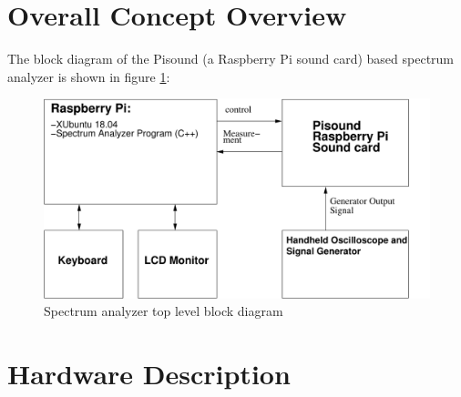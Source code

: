 \documentclass[11pt, oneside]{scrartcl}   	%
\begin{document}
\section{Overall Concept Overview}
The block diagram of the Pisound (a Raspberry Pi sound card) based spectrum analyzer is shown in figure \ref{fig:toplevelfunctionalblock}:
\begin{figure}[tbph]
	\centering
	\includegraphics[width=\linewidth]{TopLevelFunctionalBlock}
	\caption[Spectrum analyzer top level block diagram]{Spectrum analyzer top level block diagram}
	\label{fig:toplevelfunctionalblock}
\end{figure}
\newpage
\section{Hardware Description}
\end{document}
